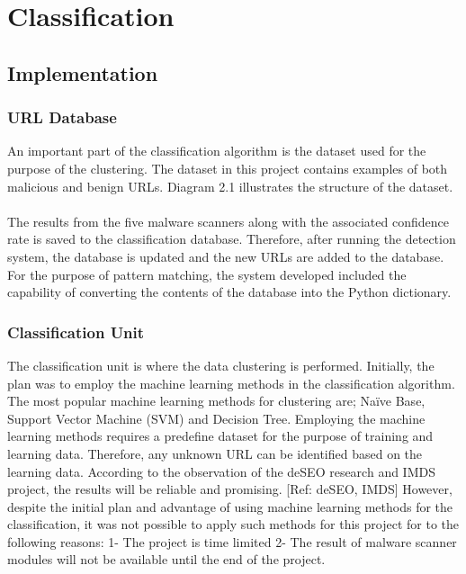 \section{Classification}

\subsection{Implementation}

\subsubsection{URL Database}

An important part of the classification algorithm is the dataset used for the purpose of the clustering. The dataset in this project contains examples of both malicious and benign URLs. Diagram 2.1 illustrates the structure of the dataset.  


\paragraph{} 
The results from the five malware scanners along with the associated confidence rate is saved to the classification database. Therefore, after running the detection system, the database is updated and the new URLs are added to the database. For the purpose of pattern matching, the system developed included the capability of converting the contents of the database into the Python dictionary.

\subsubsection{Classification Unit}
 
The classification unit is where the data clustering is performed. Initially, the plan was to employ the machine learning methods in the classification algorithm. The most popular machine learning methods for clustering are; Naïve Base, Support Vector Machine (SVM) and Decision Tree. Employing the machine learning methods requires a predefine dataset for the purpose of training and learning data. Therefore, any unknown URL can be identified based on the learning data. According to the observation of the deSEO research and IMDS project, the results will be reliable and promising. [Ref: deSEO, IMDS]
However, despite the initial plan and advantage of using machine learning methods for the classification, it was not possible to apply such methods for this project for to the following reasons:
1-	The project is time limited  
2-	The result of malware scanner modules will not be available until the end of the project.

